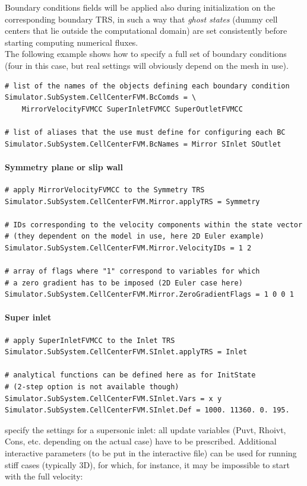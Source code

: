 \documentclass[11pt]{article}
\begin{document}
Boundary conditions fields will be applied also during initialization on the corresponding boundary TRS,
in such a way that {\it ghost states} (dummy cell centers that lie outside the computational domain) are set 
consistently before starting computing numerical fluxes. \\
The following example shows how to specify a full set of boundary conditions (four in this case, but 
real settings will obviously depend on the mesh in use).

\begin{lstlisting}[breaklines]
# list of the names of the objects defining each boundary condition
Simulator.SubSystem.CellCenterFVM.BcComds = \
    MirrorVelocityFVMCC SuperInletFVMCC SuperOutletFVMCC

# list of aliases that the use must define for configuring each BC
Simulator.SubSystem.CellCenterFVM.BcNames = Mirror SInlet SOutlet
\end{lstlisting}

\paragraph{Symmetry plane or slip wall}

\begin{lstlisting}[breaklines]
# apply MirrorVelocityFVMCC to the Symmetry TRS 
Simulator.SubSystem.CellCenterFVM.Mirror.applyTRS = Symmetry

# IDs corresponding to the velocity components within the state vector
# (they dependent on the model in use, here 2D Euler example)
Simulator.SubSystem.CellCenterFVM.Mirror.VelocityIDs = 1 2

# array of flags where "1" correspond to variables for which 
# a zero gradient has to be imposed (2D Euler case here)
Simulator.SubSystem.CellCenterFVM.Mirror.ZeroGradientFlags = 1 0 0 1
\end{lstlisting}

\paragraph{Super inlet}

\begin{lstlisting}[breaklines]
# apply SuperInletFVMCC to the Inlet TRS
Simulator.SubSystem.CellCenterFVM.SInlet.applyTRS = Inlet

# analytical functions can be defined here as for InitState 
# (2-step option is not available though)
Simulator.SubSystem.CellCenterFVM.SInlet.Vars = x y
Simulator.SubSystem.CellCenterFVM.SInlet.Def = 1000. 11360. 0. 195.
\end{lstlisting}
specify the settings for a supersonic inlet: all update variables (Puvt, 
Rhoivt, Cons, etc. depending on the actual case) have to be prescribed.
Additional interactive parameters (to be put in the interactive file) can be used 
for running stiff cases (typically 3D), for which, for instance, it may be impossible 
to start with the full velocity:
\end{document}
